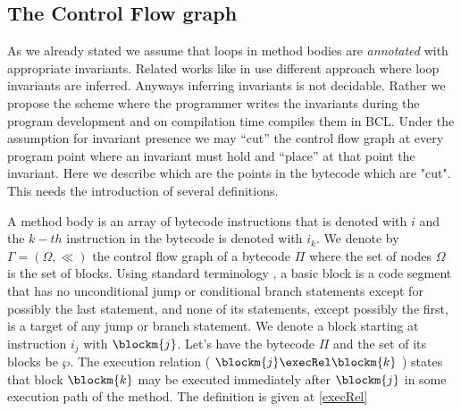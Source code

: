 
\subsection{The Control Flow graph}\label{abstrCntrFlow}
As we  already stated we assume that loops in method bodies are  \textit{annotated} with appropriate invariants. 
Related works like in \cite{WildmoserN-ESOP05} use different approach where loop invariants are inferred. Anyways inferring invariants is not decidable. 
Rather we propose the scheme where the programmer writes the invariants during the program development  
and on compilation time compiles them in BCL. Under the assumption for invariant presence we may ``cut'' the control flow graph at every program point
where an invariant must hold and ``place'' at that point the invariant. Here we describe which are the points in the bytecode which are "cut". This needs the introduction
of several definitions.
     
 A method body is an array of bytecode instructions that is denoted with $i$ and the $k-th$ instruction
 in the bytecode is  denoted with $i_{k}$.
 We denote by $\Gamma  = ( \Omega, \ll)$ the control flow graph of a
bytecode $\Pi$ where the set of nodes $\Omega$ is the set of
blocks. Using standard terminology \cite{ARUCom1986}, a
basic block is a code segment that has no unconditional jump or
conditional branch statements except for possibly the last
statement, and none of its statements, except possibly the first,
is a target of any jump or branch statement. 
 We denote a block starting at instruction  $i_{j}$ with $\blockm{j}$. Let's have 
the bytecode $\Pi$ and the set of its blocks be $\wp$. The execution relation ( $\blockm{j} \execRel \blockm{k}$ ) states that block
$ \blockm{k}$ may be executed immediately after $\blockm{j}$ in some execution path of the method. 
The  definition is given at \ref{execRel}

